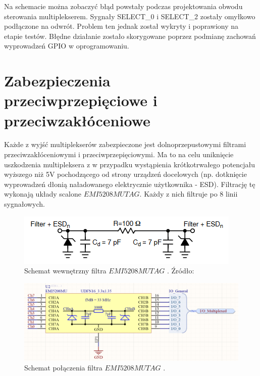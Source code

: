 Na schemacie można zobaczyć błąd powstały podczas projektowania obwodu sterowania multiplekserem. Sygnały SELECT\_0 i SELECT\_2 zostały omyłkowo podłączone na odwrót. Problem ten jednak został wykryty i poprawiony na etapie testów. Błędne działanie zostało skorygowane poprzez podmianę zachowań wyprowadzeń GPIO w oprogramowaniu.


\section{Zabezpieczenia przeciwprzepięciowe i przeciwzakłóceniowe}
Każde z wyjść multiplekserów zabezpieczone jest dolnoprzepustowymi filtrami przeciwzakłóceniowymi i przeciwprzepięciowymi. Ma to na celu uniknięcie uszkodzenia multipleksera z w przypadku wystąpienia krótkotrwałego potencjału wyższego niż 5V pochodzącego od strony urządzeń docelowych (np. dotknięcie wyprowadzeń dłonią naładowanego elektrycznie użytkownika - ESD). Filtrację tę wykonają układy scalone $EMI5208MUTAG$. Każdy z nich filtruje po 8 linii sygnałowych.

 \begin{figure}[H]
    \centering
    \includegraphics[width=0.7\paperwidth]{images/EMI5208MUTAG_internal_schematic.png}
    \caption{Schemat wewnętrzny filtra $EMI5208MUTAG$ . Źródło:\cite{EMI5208MUTAG_datasheet}}
    \label{EMI5208MUTAG_internal_schematic}
\end{figure}

 \begin{figure}[H]
    \centering
    \includegraphics[width=0.7\paperwidth]{images/EMI_connection.png}
    \caption{Schemat połączenia filtra $EMI5208MUTAG$ .}
    \label{EMI5208MUTAG_connection diagram}
\end{figure}


